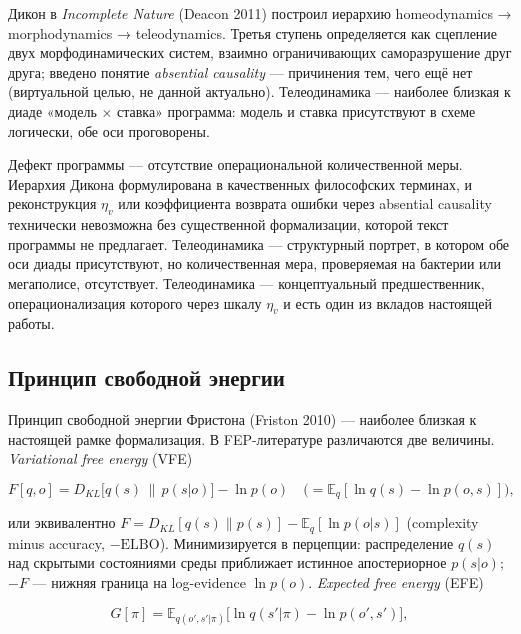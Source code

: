 \documentclass[pdflatex,sn-mathphys-ay]{sn-jnl}
\begin{document}
Дикон в \emph{Incomplete Nature} (Deacon 2011) построил иерархию homeodynamics → morphodynamics → teleodynamics. Третья ступень определяется как сцепление двух морфодинамических систем, взаимно ограничивающих саморазрушение друг друга; введено понятие \emph{absential causality} --- причинения тем, чего ещё нет (виртуальной целью, не данной актуально). Телеодинамика --- наиболее близкая к диаде «модель × ставка» программа: модель и ставка присутствуют в схеме логически, обе оси проговорены.

Дефект программы --- отсутствие операциональной количественной меры. Иерархия Дикона формулирована в качественных философских терминах, и реконструкция \(\eta_v\) или коэффициента возврата ошибки через absential causality технически невозможна без существенной формализации, которой текст программы не предлагает. Телеодинамика --- структурный портрет, в котором обе оси диады присутствуют, но количественная мера, проверяемая на бактерии или мегаполисе, отсутствует. Телеодинамика --- концептуальный предшественник, операционализация которого через шкалу \(\eta_v\) и есть один из вкладов настоящей работы.

\subsection{Принцип свободной энергии}\label{ux43fux440ux438ux43dux446ux438ux43f-ux441ux432ux43eux431ux43eux434ux43dux43eux439-ux44dux43dux435ux440ux433ux438ux438}

Принцип свободной энергии Фристона (Friston 2010) --- наиболее близкая к настоящей рамке формализация. В FEP-литературе различаются две величины. \emph{Variational free energy} (VFE)

\begin{equation}F[q, o] = D_{KL}\bigl[q(s) \,\|\, p(s|o)\bigr] - \ln p(o) \quad \bigl(= \mathbb{E}_q[\ln q(s) - \ln p(o, s)]\bigr), \tag{3}\end{equation}

или эквивалентно \(F = D_{KL}[q(s) \| p(s)] - \mathbb{E}_q[\ln p(o|s)]\) (complexity minus accuracy, \(-\text{ELBO}\)). Минимизируется в перцепции: распределение \(q(s)\) над скрытыми состояниями среды приближает истинное апостериорное \(p(s|o)\); \(-F\) --- нижняя граница на log-evidence \(\ln p(o)\). \emph{Expected free energy} (EFE)

\begin{equation}G[\pi] = \mathbb{E}_{q(o', s'|\pi)}\bigl[\ln q(s'|\pi) - \ln p(o', s')\bigr], \tag{4}\end{equation}
\end{document}
